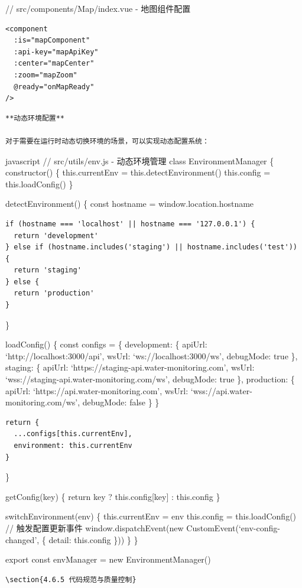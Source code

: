 {{// src/components/Map/index.vue - 地图组件配置

\begin{verbatim}
<component 
  :is="mapComponent" 
  :api-key="mapApiKey"
  :center="mapCenter"
  :zoom="mapZoom"
  @ready="onMapReady"
/>
\end{verbatim}

\begin{lstlisting}
**动态环境配置**

对于需要在运行时动态切换环境的场景，可以实现动态配置系统：
\end{lstlisting}

javascript // src/utils/env.js - 动态环境管理 class EnvironmentManager \{ constructor() \{ this.currentEnv = this.detectEnvironment() this.config = this.loadConfig() \}

detectEnvironment() \{ const hostname = window.location.hostname

\begin{verbatim}
if (hostname === 'localhost' || hostname === '127.0.0.1') {
  return 'development'
} else if (hostname.includes('staging') || hostname.includes('test')) {
  return 'staging'
} else {
  return 'production'
}
\end{verbatim}

\}

loadConfig() \{ const configs = \{ development: \{ apiUrl: `http://localhost:3000/api', wsUrl: `ws://localhost:3000/ws', debugMode: true \}, staging: \{ apiUrl: `https://staging-api.water-monitoring.com', wsUrl: `wss://staging-api.water-monitoring.com/ws', debugMode: true \}, production: \{ apiUrl: `https://api.water-monitoring.com', wsUrl: `wss://api.water-monitoring.com/ws', debugMode: false \} \}

\begin{verbatim}
return {
  ...configs[this.currentEnv],
  environment: this.currentEnv
}
\end{verbatim}

\}

getConfig(key) \{ return key ? this.config{[}key{]} : this.config \}

switchEnvironment(env) \{ this.currentEnv = env this.config = this.loadConfig() // 触发配置更新事件 window.dispatchEvent(new CustomEvent(`env-config-changed', \{ detail: this.config \})) \} \}

export const envManager = new EnvironmentManager()

\begin{lstlisting}
\section{4.6.5 代码规范与质量控制}


\end{lstlisting}}}

